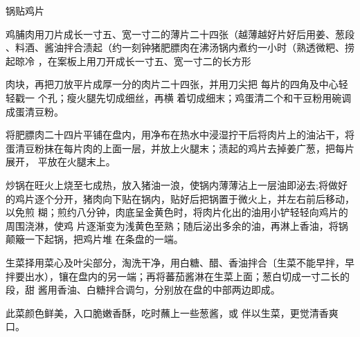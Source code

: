 \begin{recipe}{锅贴鸡片}

\ingredients


\cooking

\step 鸡脯肉用刀片成长一寸五、宽一寸二的薄片二十四张（越薄越好片好后用姜、葱段
、料酒、酱油拌合渍起（约一刻钟猪肥膘肉在沸汤锅内煮约一小时（熟透微粑、捞起晾冷
，在案板上用刀开成长一寸五、宽一寸二的长方形

肉块，再把刀放平片成厚一分的肉片二十四张，并用刀尖把 每片的四角及中心轻轻戳一
个孔；瘦火腿先切成细丝，再横 着切成细末；鸡蛋清二个和干豆粉用碗调成蛋清豆粉。

\step 将肥膘肉二十四片平铺在盘内，用净布在热水中浸湿拧干后将肉片上的油沾干，将
蛋清豆粉抹在每片肉的上面一层，并放上火腿末；渍起的鸡片去掉姜广葱，把每片展开，
平放在火腿末上。

\step 炒锅在旺火上烧至七成热，放入猪油一浪，使锅内薄薄沾上一层油即泌去;将做好
的鸡片逐个分开，猪肉向下贴在锅内，贴好后把锅置于微火上，并左右前后移动，以免煎
糊；煎约八分钟，肉底呈金黄色时，将肉片化出的油用小铲轻轻向鸡片的周围浇淋，使鸡
片逐渐变为浅黄色至熟；随后泌出多余的油，再淋上香油，将锅颠簸一下起锅，把鸡片堆
在条盘的一端。

\step 生菜择用菜心及叶尖部分，淘洗干净，用白糖、醋、香油拌合〔生菜不能早拌，早
拌要出水），镶在盘内的另一端；再将蕃茄酱淋在生菜上面；葱白切成一寸二长的段，甜
酱用香油、白糖拌合调匀，分别放在盘的中部两边即成。

\features

此菜颜色鲜美，入口脆嫩香酥，吃时蘸上一些葱酱，或 伴以生菜，更觉清香爽口。

\end{recipe}

